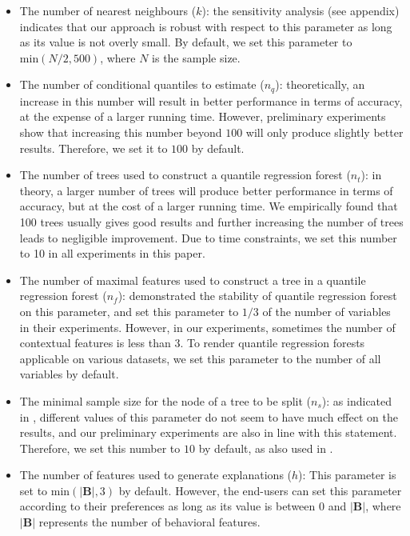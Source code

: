 \documentclass[pdflatex,sn-basic]{sn-jnl}%
\theoremstyle{thmstyleone}%
\theoremstyle{thmstyletwo}%
\theoremstyle{thmstylethree}%
\begin{document}
\begin{itemize}
\item The number of nearest neighbours ($k$): the sensitivity analysis (see appendix) indicates that our approach is robust with respect to this parameter as long as its value is not overly small. By default, we set this parameter to $\mathrm{min}(N/2,500)$, where $N$ is the sample size. 

\item The number of conditional quantiles to estimate ($n_q$): theoretically, an increase in this number will result in better performance in terms of accuracy, at the expense of a larger running time. However, preliminary experiments show that increasing this number beyond $100$ will only produce slightly better results. Therefore, we set it to $100$ by default.

\item The number of trees used to construct a quantile regression forest ($n_t$): in theory, a larger number of trees will produce better performance in terms of accuracy, but at the cost of a larger running time. We empirically found that 100 trees usually gives good results and further increasing the number of trees leads to negligible improvement. Due to time constraints, we set this number to 10 in all experiments in this paper.

\item The number of maximal features used to construct a tree in a quantile regression forest ($n_f$):  \cite{meinshausen2006quantile} demonstrated the stability of quantile regression forest on this parameter, and set this parameter to $1/3$ of the number of variables in their experiments. However, in our experiments, sometimes the number of contextual features is less than 3. To render quantile regression forests applicable on various datasets, we set this parameter to the number of all variables by default. 

\item The minimal sample size for the node of a tree to be split ($n_s$): as indicated in \cite{meinshausen2006quantile}, different values of this parameter do not seem to have much effect on the results, and our preliminary experiments are also in line with this statement. Therefore, we set this number to $10$ by default, as also used in \cite{meinshausen2006quantile}.
\item The number of features used to generate explanations ($h$): This parameter is set to $\mathrm{min}(\vert \mathbf{B} \vert,3)$ by default. However, the end-users can set this parameter according to their preferences as long as its value is between $0$ and $\vert \mathbf{B} \vert $, where 
$\vert \mathbf{B} \vert $ represents the number of behavioral features.
\end{itemize}
\end{document}
